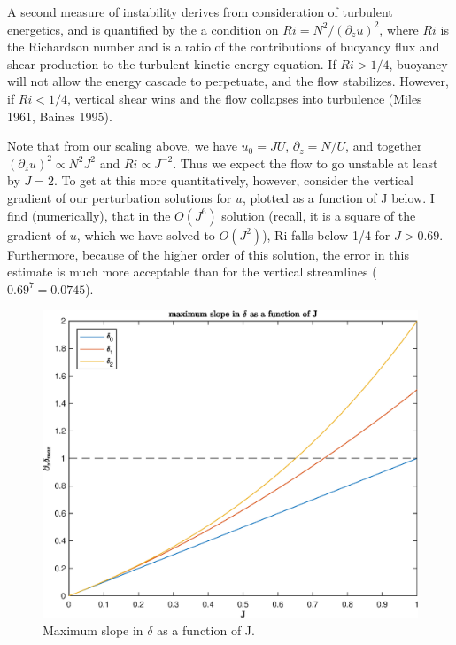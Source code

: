 \documentclass[12pt]{article}
\begin{document}
A second measure of instability derives from consideration of turbulent energetics, and is quantified by the  a condition on $Ri = N^2/(\partial_z u)^2$, where $Ri$ is the Richardson number and is a ratio of the  contributions of buoyancy flux and shear production  to the turbulent kinetic energy equation. If $Ri>1/4$, buoyancy will not allow the energy cascade to perpetuate, and the flow stabilizes. However, if $Ri<1/4$, vertical shear wins and the flow collapses into turbulence (Miles 1961, Baines 1995). 

Note that from our scaling above, we have $u_0 = JU$, $\partial_z = N/U$, and together $(\partial_z u)^2 \propto N^2J^2$ and $Ri \propto J^{-2}$. Thus we expect the flow to go unstable at least by $J=2$. To get at this more quantitatively, however, consider the vertical gradient of our perturbation solutions for $u$, plotted as a function of J below. I find (numerically), that in the $O(J^6)$ solution (recall, it is a square of the gradient of $u$, which we have solved to $O(J^2)$), Ri falls below 1/4 for $J>0.69$. Furthermore, because of the higher order of this solution, the error in this estimate is much more acceptable than for the vertical streamlines ($0.69^7=0.0745$).


\begin{figure}
	\centering
	\includegraphics[width=1\textwidth]{max_slopes.eps}
	\caption{Maximum slope in $\delta$ as a function of J.}
\end{figure}
\end{document}
